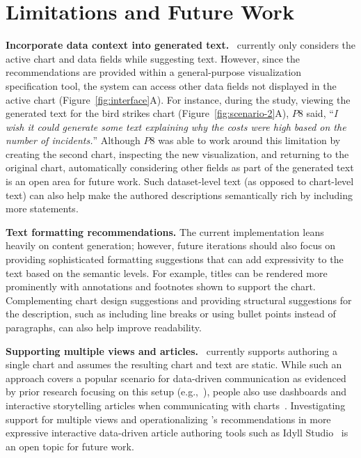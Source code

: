 \section{Limitations and Future Work}
\noindent\textbf{Incorporate data context into generated text.}
\pluto~currently only considers the active chart and data fields while suggesting text.
However, since the recommendations are provided within a general-purpose visualization specification tool, the system can access other data fields not displayed in the active chart (Figure~\ref{fig:interface}A).
For instance, during the study, viewing the generated text for the bird strikes chart (Figure~\ref{fig:scenario-2}A), $P8$ said, ``\textit{I wish it could generate some text explaining why the costs were high based on the number of incidents.}''
Although $P8$ was able to work around this limitation by creating the second chart, inspecting the new visualization, and returning to the original chart, automatically considering other fields as part of the generated text is an open area for future work.
Such dataset-level text (as opposed to chart-level text) can also help make the authored descriptions semantically rich by including more  statements.

\vspace{.5em}
\noindent\textbf{Text formatting recommendations.}
The current implementation leans heavily on content generation; however, future iterations should also focus on providing sophisticated formatting suggestions that can add expressivity to the text based on the semantic levels.
For example, titles can be rendered more prominently with annotations and footnotes shown to support the chart. Complementing chart design suggestions and providing structural suggestions for the description, such as including line breaks or using bullet points instead of paragraphs, can also help improve readability.

\vspace{.5em}
\noindent\textbf{Supporting multiple views and articles.} \pluto~currently supports authoring a single chart and assumes the resulting chart and text are static.
While such an approach covers a popular scenario for data-driven communication as evidenced by prior research focusing on this setup (e.g.,~\cite{choi2022intentable,obeid2020chart,liu2020autocaption,tang2023vistext,hsu2021scicap,stokes2022striking}), people also use dashboards and interactive storytelling articles when communicating with charts~\cite{sarikaya2018we,segel2010narrative}. Investigating support for multiple views and operationalizing \pluto's recommendations in more expressive interactive data-driven article authoring tools such as Idyll Studio~\cite{conlen2021idyll} is an open topic for future work.


